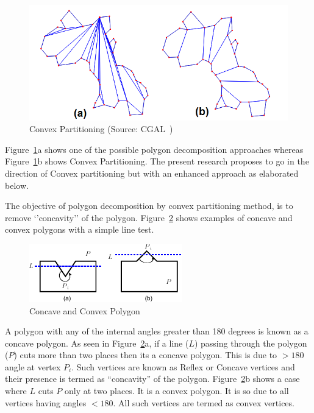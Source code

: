 
\begin{figure}[h]
\centering \includegraphics[width=0.62\linewidth]{../Common/images/convexcgal} 
\caption{Convex Partitioning (Source: CGAL~\cite{cgal})}
\label{fig_cgal}
\end{figure}


Figure~\ref{fig_cgal}a shows one of the possible polygon decomposition approaches whereas Figure~\ref{fig_cgal}b shows Convex Partitioning. The present research proposes to go in the direction of Convex partitioning but with an enhanced approach as elaborated below.


The objective of polygon decomposition by convex partitioning method, is to remove `'concavity'' of the polygon. Figure~\ref{fig_concave} shows examples of concave and convex polygons with a simple line test. 



\begin{figure}[h]
\centering \includegraphics[width=0.62\linewidth]{../Common/images/polyconcavity.pdf} 
\caption{Concave and Convex Polygon}
\label{fig_concave}
\end{figure}


A polygon with any of the internal angles greater than 180 degrees is known as a concave polygon. As seen in Figure~\ref{fig_concave}a, if a line ($L$) passing through the polygon ($P$) cuts more than two places then its a concave polygon. This is due to $>180$ angle at vertex $P_i$. Such vertices are known as Reflex or Concave vertices and their presence is termed as ``concavity'' of the polygon. Figure~\ref{fig_concave}b shows a case where $L$ cuts $P$ only at two places. It is a convex polygon. It is so due to all vertices having angles $<180$. All such vertices are termed as convex vertices.


